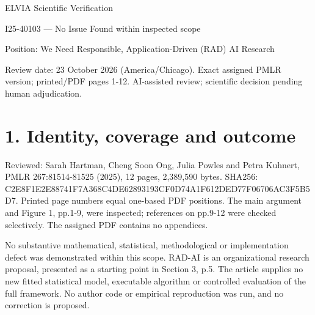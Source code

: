 \documentclass[10pt]{article}
\begin{document}
ELVIA Scientific Verification\par
I25-40103 — No Issue Found within inspected scope\par
Position: We Need Responsible, Application-Driven (RAD) AI Research\par
Review date: 23 October 2026 (America/Chicago). Exact assigned PMLR version; printed/PDF pages 1-12. AI-assisted review; scientific decision pending human adjudication.\par
\section*{1. Identity, coverage and outcome}
Reviewed: Sarah Hartman, Cheng Soon Ong, Julia Powles and Petra Kuhnert, PMLR 267:81514-81525 (2025), 12 pages, 2,389,590 bytes. SHA256: C2E8F1E2E88741F7A368C4DE62893193CF0D74A1F612DED77F06706AC3F5B5D7. Printed page numbers equal one-based PDF positions. The main argument and Figure 1, pp.1-9, were inspected; references on pp.9-12 were checked selectively. The assigned PDF contains no appendices.\par
No substantive mathematical, statistical, methodological or implementation defect was demonstrated within this scope. RAD-AI is an organizational research proposal, presented as a starting point in Section 3, p.5. The article supplies no new fitted statistical model, executable algorithm or controlled evaluation of the full framework. No author code or empirical reproduction was run, and no correction is proposed.\par
\end{document}
